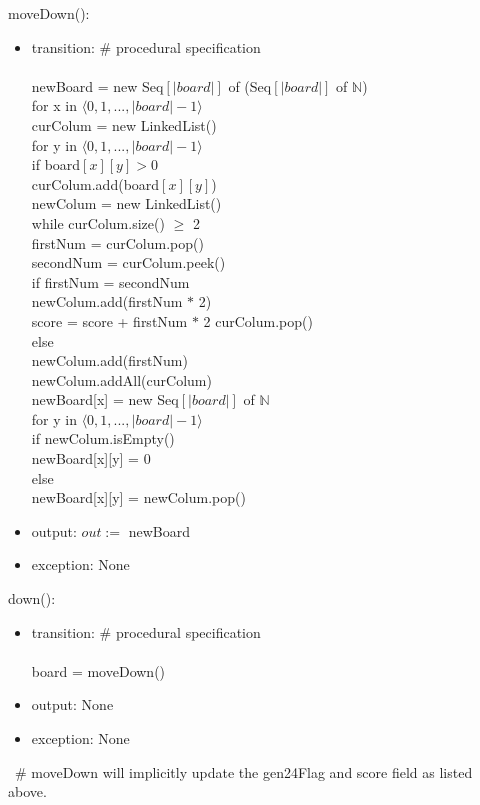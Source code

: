 \documentclass[12pt]{article}
\begin{document}
\noindent moveDown():
\begin{itemize}
\item transition: \# procedural specification\\\\
newBoard = new Seq$[|board|]$ of (Seq$[|board|]$ of $\mathbb{N}$)\\
for x in $\langle 0, 1, ..., |board|-1 \rangle$\\
\tabto{0.5cm} curColum = new LinkedList()\\
\tabto{0.5cm} for y in $\langle 0, 1, ..., |board|-1 \rangle$\\
\tabto{1.0cm} if board$[x][y] > 0$\\
\tabto{1.5cm} curColum.add(board$[x][y]$)\\
\tabto{0.5cm} newColum = new LinkedList()\\
\tabto{0.5cm} while curColum.size() $\geq$ 2\\
\tabto{1.0cm} firstNum = curColum.pop()\\
\tabto{1.0cm} secondNum = curColum.peek()\\
\tabto{1.0cm} if firstNum = secondNum\\
\tabto{1.5cm} newColum.add(firstNum $*$ 2)\\
\tabto{1.5cm} score = score + firstNum $*$ 2
\tabto{1.5cm} curColum.pop()\\
\tabto{1.0cm} else\\
\tabto{1.5cm} newColum.add(firstNum)\\
\tabto{0.5cm} newColum.addAll(curColum)\\
\tabto{0.5cm} newBoard[x] = new Seq$[|board|]$ of $\mathbb{N}$\\
\tabto{0.5cm} for y in $\langle 0, 1, ..., |board|-1 \rangle$\\
\tabto{1.0cm} if newColum.isEmpty()\\
\tabto{1.5cm} newBoard[x][y] = 0\\
\tabto{1.0cm} else\\
\tabto{1.5cm} newBoard[x][y] = newColum.pop()


\item output: $out :=$ newBoard
\item exception: None
\end{itemize}

\noindent down():
\begin{itemize}
\item transition: \# procedural specification\\\\
board = moveDown()
\item output: None
\item exception: None
\end{itemize}
~\noindent \# moveDown will implicitly update the gen24Flag and score field as listed above.\\
\end{document}
